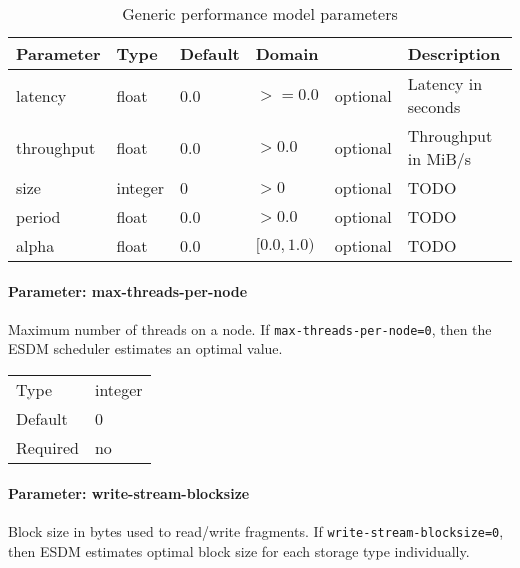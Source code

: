 \begin{preserve}
\begin{table}[!ht]
  \begin{center}
    \begin{tabularx}{\textwidth}{lllllX}
      Parameter  & Type    & Default & Domain      &          & Description         \\ 
      \hline
      latency    & float   & 0.0     & $>=0.0$     & optional & Latency in seconds  \\ 
      throughput & float   & 0.0     & $>0.0$      & optional & Throughput in MiB/s \\ 
      size       & integer & 0       & $>0$        & optional & TODO                \\ 
      period     & float   & 0.0     & $>0.0$      & optional & TODO                \\ 
      alpha      & float   & 0.0     & $[0.0,1.0)$ & optional & TODO                \\ 
    \end{tabularx}
  \end{center}
  \caption{Generic performance model parameters}%
  \label{tab:gen_perf_model_conf_params}
\end{table}
\end{preserve}

\FloatBarrier
\vspace{\gapsize}


\paragraph{Parameter: max-threads-per-node}
Maximum number of threads on a node.
If \lstinline|max-threads-per-node=0|, then the ESDM scheduler estimates an optimal value.

\begin{preserve}
  \noindent
  \begin{tabular}{ll}
    Type     & integer \\ 
    Default  & 0       \\ 
    Required & no      \\ 
  \end{tabular}
\end{preserve}
\FloatBarrier
\vspace{\gapsize}

\paragraph{Parameter: write-stream-blocksize}
Block size in bytes used to read/write fragments.
If \lstinline|write-stream-blocksize=0|, then ESDM estimates optimal block size for each storage type individually.

